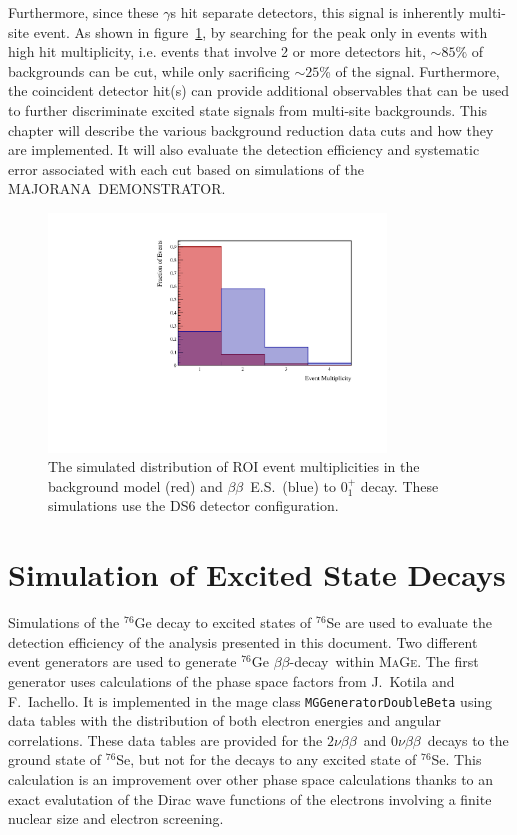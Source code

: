 \documentclass[notitlepage,rmp,aps,10pt]{revtex4-1}
\newcommand{\MJ}{M{\footnotesize AJORANA}}
\newcommand{\Demo}{D{\footnotesize EMON\-STRAT\-OR}}
\newcommand{\MJD}{\MJ\ \Demo}
\newcommand{\bb}{${\beta \beta}$}
\newcommand{\znbb}{${0 \nu \beta \beta}$}
\newcommand{\tnbb}{${2 \nu \beta \beta}$}
\newcommand{\bbes}{\bb~E.S.}
\newcommand{\Mage}{\textsc{MaGe}}
\newcommand{\iso}[2]{$^{#1}$#2}
\newcommand{\Ge}[1]{\iso{#1}{Ge}}
\newcommand{\Se}[1]{\iso{#1}{Se}}
\newcommand{\SP}[3]{$#1^{#2}_{#3}$}
\newcommand{\msmd}{multi-site event}
\begin{document}
Furthermore, since these $\gamma$s hit separate detectors, this signal is inherently \msmd.
As shown in figure~\ref{fig:multhist}, by searching for the peak only in events with high hit multiplicity, i.e. events that involve 2 or more detectors hit, $\sim85\%$ of backgrounds can be cut, while only sacrificing $\sim25$\% of the signal.
Furthermore, the coincident detector hit(s) can provide additional observables that can be used to further discriminate excited state signals from multi-site backgrounds.
This chapter will describe the various background reduction data cuts and how they are implemented.
It will also evaluate the detection efficiency and systematic error associated with each cut based on simulations of the \MJD.

\begin{figure}[h]
  \centering
  \includegraphics[width=0.8\textwidth]{MultHist}
  \caption[Event Multiplicity in E.S. decay and BG model simulations]{\label{fig:multhist}
    The simulated distribution of ROI event multiplicities in the background model (red) and \bbes\ (blue) to \SP{0}{+}{1} decay. These simulations use the DS6 detector configuration.}
\end{figure}

\section{Simulation of Excited State Decays} \label{sec:essims}
Simulations of the \Ge{76} decay to excited states of \Se{76} are used to evaluate the detection efficiency of the analysis presented in this document.
Two different event generators are used to generate \Ge{76} \bb-decay\ within \Mage.
The first generator uses calculations of the phase space factors from J.~Kotila and F.~Iachello\cite{Kotila2012}.
It is implemented in the mage class \texttt{MGGeneratorDoubleBeta} using data tables with the distribution of both electron energies and angular correlations.
These data tables are provided for the \tnbb\ and \znbb\ decays to the ground state of \Se{76}, but not for the decays to any excited state of \Se{76}.
This calculation is an improvement over other phase space calculations thanks to an exact evalutation of the Dirac wave functions of the electrons involving a finite nuclear size and electron screening.
\end{document}
